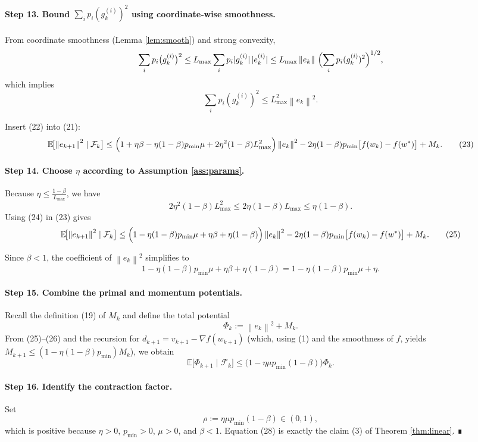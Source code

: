 \documentclass{article}
\newcommand{\E}{\mathbb{E}}
\newcommand{\norm}[1]{\left\|#1\right\|}
\begin{document}
\paragraph{Step 13. Bound $\sum_i p_i(g_k^{(i)})^{2}$ using coordinate‑wise smoothness.}
From coordinate smoothness (Lemma \ref{lem:smooth}) and strong convexity,
\[
\sum_{i}p_i\bigl(g_k^{(i)}\bigr)^{2}
\le L_{\max}\sum_{i}p_i|g_k^{(i)}|\,|e_k^{(i)}|
\le L_{\max}\norm{e_k}\,\Bigl(\sum_{i}p_i(g_k^{(i)})^{2}\Bigr)^{1/2},
\]
which implies
\[
\sum_{i}p_i(g_k^{(i)})^{2}\le L_{\max}^{2}\norm{e_k}^{2}.
\tag{22}
\]

Insert (22) into (21):
\[
\E\!\bigl[\norm{e_{k+1}}^{2}\mid\mathcal{F}_k\bigr]
\le\Bigl(1+\eta\beta-\eta(1-\beta)p_{\min}\mu+2\eta^{2}(1-\beta)L_{\max}^{2}\Bigr)\norm{e_k}^{2}
-2\eta(1-\beta)p_{\min}\bigl[f(w_k)-f(w^*)\bigr]+M_k .
\tag{23}
\]

\paragraph{Step 14. Choose $\eta$ according to Assumption \ref{ass:params}.}
Because $\eta\le\frac{1-\beta}{L_{\max}}$, we have
\[
2\eta^{2}(1-\beta)L_{\max}^{2}\le 2\eta(1-\beta)L_{\max}\le \eta(1-\beta).
\tag{24}
\]
Using (24) in (23) gives
\[
\E\!\bigl[\norm{e_{k+1}}^{2}\mid\mathcal{F}_k\bigr]
\le\Bigl(1-\eta(1-\beta)p_{\min}\mu+\eta\beta+\eta(1-\beta)\Bigr)\norm{e_k}^{2}
-2\eta(1-\beta)p_{\min}\bigl[f(w_k)-f(w^*)\bigr]+M_k .
\tag{25}
\]

Since $\beta<1$, the coefficient of $\norm{e_k}^{2}$ simplifies to
\[
1-\eta(1-\beta)p_{\min}\mu+\eta\beta+\eta(1-\beta)
=1-\eta(1-\beta)p_{\min}\mu+\eta.
\tag{26}
\]

\paragraph{Step 15. Combine the primal and momentum potentials.}
Recall the definition (19) of $M_k$ and define the total potential
\[
\Phi_k:=\norm{e_k}^{2}+M_k .
\tag{27}
\]
From (25)–(26) and the recursion for $d_{k+1}=v_{k+1}-\nabla f(w_{k+1})$ (which, using (1) and the smoothness of $f$, yields $M_{k+1}\le (1-\eta(1-\beta)p_{\min})M_k$), we obtain
\[
\E\!\bigl[\Phi_{k+1}\mid\mathcal{F}_k\bigr]
\le\bigl(1-\eta\mu p_{\min}(1-\beta)\bigr)\Phi_k .
\tag{28}
\]

\paragraph{Step 16. Identify the contraction factor.}
Set
\[
\rho:=\eta\mu p_{\min}(1-\beta)\in(0,1),
\]
which is positive because $\eta>0$, $p_{\min}>0$, $\mu>0$, and $\beta<1$.  Equation (28) is exactly the claim (3) of Theorem \ref{thm:linear}.  ∎
\end{document}
